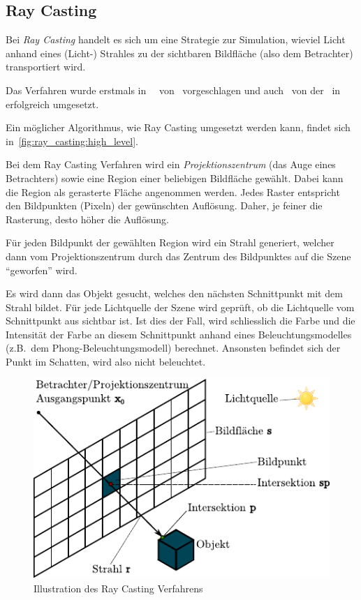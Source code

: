 \subsection{Ray Casting}
\label{subsec:ray_casting}

Bei \textit{Ray Casting} handelt es sich um eine Strategie zur
Simulation, wieviel Licht anhand eines (Licht-) Strahles zu der
sichtbaren Bildfläche (also dem Betrachter) transportiert wird.

Das Verfahren wurde erstmals
in~~\citeyear{appel_techniques_1968}
von~\citeauthor{appel_techniques_1968} vorgeschlagen und
auch~\citeyear{arlington_mathematical_applications_group_inc_afips_1968}
von
der~\citeauthor{arlington_mathematical_applications_group_inc_afips_1968}
in~
erfolgreich umgesetzt.

Ein möglicher Algorithmus, wie Ray Casting umgesetzt werden kann, findet
sich in~\autoref{fig:ray_casting:high_level}.

Bei dem Ray Casting Verfahren wird ein \textit{Projektionszentrum} (das
Auge eines Betrachters) sowie eine Region einer beliebigen Bildfläche
gewählt. Dabei kann die Region als gerasterte Fläche angenommen werden.
Jedes Raster entspricht den Bildpunkten (Pixeln) der gewünschten
Auflösung.  Daher, je feiner die Rasterung, desto höher die Auflösung.

Für jeden Bildpunkt der gewählten Region wird ein Strahl
generiert, welcher dann vom Projektionszentrum durch das Zentrum des
Bildpunktes auf die Szene ``geworfen'' wird. 

Es wird dann das Objekt gesucht, welches den nächsten Schnittpunkt mit
dem Strahl bildet. Für jede Lichtquelle der Szene wird geprüft, ob die
Lichtquelle vom Schnittpunkt aus sichtbar ist. Ist dies der Fall, wird
schliesslich die Farbe und die Intensität der Farbe an diesem Schnittpunkt
anhand eines Beleuchtungsmodelles (z.B.\ dem Phong-Beleuchtungsmodell)
berechnet. Ansonsten befindet sich der Punkt im Schatten, wird also
nicht beleuchtet.

\begin{figure}[H]
    \centering
    \includegraphics{img/ray_casting.pdf}
    \caption{Illustration des Ray Casting Verfahrens\protect\footnotemark}\label{fig:ray_casting_illustration}
\end{figure}

